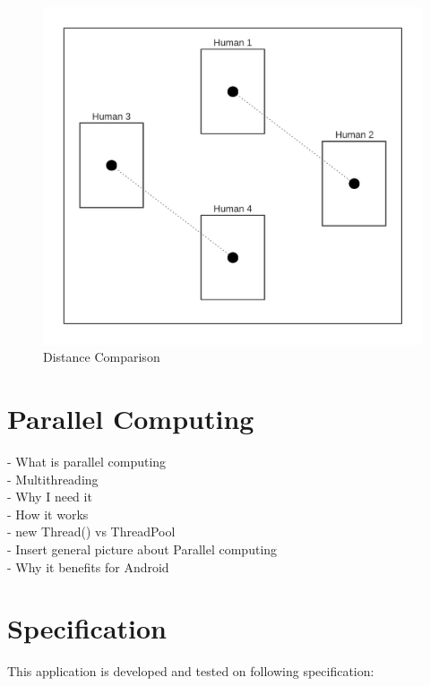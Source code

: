         \begin{figure}[!ht]
            \includegraphics[width=6in]{images/chapter2/two-distances.png}
            \caption{Distance Comparison}
            \label{twoDistances}
        \end{figure}

    \section{Parallel Computing}
        -	What is parallel computing \\
        -   Multithreading \\
        -	Why I need it \\
        -	How it works \\
            - new Thread() vs ThreadPool \\
            - Insert general picture about Parallel computing\\
        -	Why it benefits for Android\\


    \section{Specification}
        This application is developed and tested on following specification:

